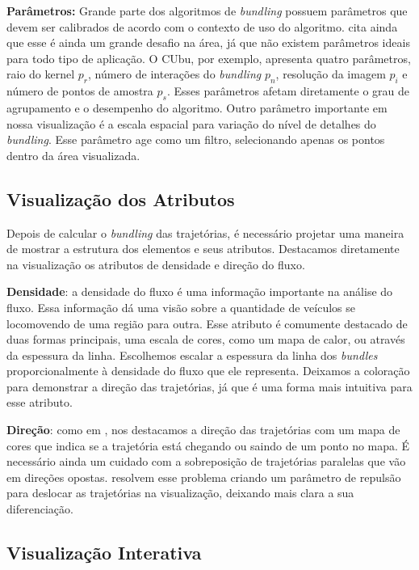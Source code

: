\textbf{Parâmetros:} Grande parte dos algoritmos de \emph{bundling} possuem
parâmetros que devem ser calibrados de acordo com o contexto de uso do
algoritmo. \citet{Lhuillier2017} cita ainda que esse é ainda um grande desafio
na área, já que não existem parâmetros ideais para todo tipo de aplicação. O
CUbu, por exemplo, apresenta quatro parâmetros, raio do kernel $p_r$, número de
interações do \emph{bundling} $p_n$, resolução da imagem $p_i$ e número de
pontos de amostra $p_s$. Esses parâmetros afetam diretamente o grau de
agrupamento e o desempenho do algoritmo. Outro parâmetro importante em nossa
visualização é a escala espacial para variação do nível de detalhes do
\emph{bundling}. Esse parâmetro age como um filtro, selecionando apenas os pontos
dentro da área visualizada.

\subsection{Visualização dos Atributos}
Depois de calcular o \emph{bundling} das trajetórias, é necessário projetar uma
maneira de mostrar a estrutura dos elementos e seus atributos. Destacamos
diretamente na visualização os atributos de densidade e direção do fluxo.

\textbf{Densidade}: a densidade do fluxo é uma informação importante na análise
do fluxo. Essa informação dá uma visão sobre a quantidade de veículos se
locomovendo de uma região para outra. Esse atributo é comumente destacado de
duas formas principais, uma escala de cores, como um mapa de calor, ou através
da espessura da linha. Escolhemos escalar a espessura da linha dos
\emph{bundles} proporcionalmente à densidade do fluxo que ele representa.
Deixamos a coloração para demonstrar a direção das trajetórias, já que é uma
forma mais intuitiva para esse atributo.

\textbf{Direção}: como em \citet{Anita2017}, nos destacamos a direção das
trajetórias com um mapa de cores que indica se a trajetória está chegando ou
saindo de um ponto no mapa. É necessário ainda um cuidado com a sobreposição de
trajetórias paralelas que vão em direções opostas. \citet{Anita2017} resolvem
esse problema criando um parâmetro de repulsão para deslocar as trajetórias na
visualização, deixando mais clara a sua diferenciação.

\subsection{Visualização Interativa}

